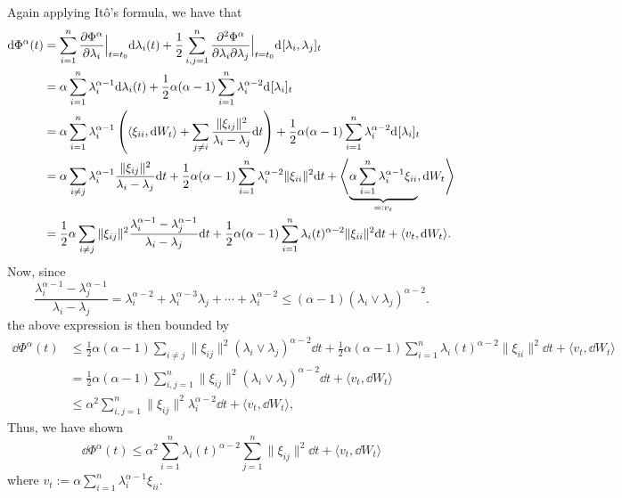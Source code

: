 Again applying Itô's formula, we have that
\begin{align*}
  \dd \Phi^\alpha(t) & = \sum_{i = 1}^n \pdv{\Phi^\alpha}{\lambda_i}\Big\vert_{t = t_0} \dd \lambda_i(t)
    + \frac{1}{2}\sum_{i, j = 1}^n \pdv[2]{\Phi^\alpha}{\lambda_i}{\lambda_j}\Big\vert_{t = t_0} \dd[][\lambda_i, \lambda_j]_{t}\\
  & = \alpha \sum_{i = 1}^n \lambda_i^{\alpha - 1} \dd \lambda_i(t)
    + \frac{1}{2}\alpha(\alpha - 1)\sum_{i = 1}^n \lambda_i^{\alpha - 2} \dd[][\lambda_i]_{t}\\
  & = \alpha \sum_{i = 1}^n \lambda_i^{\alpha - 1} \left(\langle \xi_{ii}, \dd W_t\rangle 
    + \sum_{j \neq i} \frac{\|\xi_{ij}\|^2}{\lambda_i - \lambda_j} \dd t\right) 
    + \frac{1}{2}\alpha(\alpha - 1)\sum_{i = 1}^n \lambda_i^{\alpha - 2} \dd[][\lambda_i]_{t}\\
  & = \alpha \sum_{i \neq j}\lambda_i^{\alpha - 1} \frac{\|\xi_{ij}\|^2}{\lambda_i - \lambda_j} \dd t 
    + \frac{1}{2}\alpha(\alpha - 1)\sum_{i = 1}^n \lambda_i^{\alpha - 2} \|\xi_{ii}\|^2 \dd t
    + \left\langle\underbrace{\alpha \sum_{i = 1}^n \lambda_i^{\alpha - 1} \xi_{ii}}_{=: v_t}, \dd W_t\right\rangle\\
  & = \frac{1}{2}\alpha \sum_{i \neq j}\|\xi_{ij}\|^2\frac{\lambda_i^{\alpha - 1} - \lambda_j^{\alpha -1}}{\lambda_i - \lambda_j}\dd t
    + \frac{1}{2}\alpha(\alpha - 1)\sum_{i = 1}^n \lambda_i(t)^{\alpha - 2} \|\xi_{ii}\|^2 \dd t + \langle v_t, \dd W_t\rangle.
\end{align*}
Now, since 
\[\frac{\lambda_i^{\alpha - 1} - \lambda_j^{\alpha -1}}{\lambda_i - \lambda_j}
  = \lambda_i^{\alpha - 2} + \lambda_i^{\alpha - 3}\lambda_j + \cdots + \lambda_i^{\alpha - 2} 
  \le (\alpha - 1)(\lambda_i \vee \lambda_j)^{\alpha - 2}.\]
the above expression is then bounded by 
\begin{align*}
  \dd \Phi^\alpha(t) & \le \frac{1}{2}\alpha(\alpha - 1) \sum_{i \neq j}\|\xi_{ij}\|^2 (\lambda_i \vee \lambda_j)^{\alpha - 2} \dd t
    + \frac{1}{2}\alpha(\alpha - 1)\sum_{i = 1}^n \lambda_i(t)^{\alpha - 2} \|\xi_{ii}\|^2 \dd t + \langle v_t, \dd W_t\rangle\\
  & = \frac{1}{2}\alpha(\alpha - 1) \sum_{i, j = 1}^n\|\xi_{ij}\|^2 (\lambda_i \vee \lambda_j)^{\alpha - 2} \dd t
    + \langle v_t, \dd W_t\rangle\\
  & \le \alpha^2 \sum_{i, j = 1}^n\|\xi_{ij}\|^2 \lambda_i^{\alpha - 2} \dd t + \langle v_t, \dd W_t\rangle,
\end{align*}
Thus, we have shown 
\begin{equation}\label{eq:potential_bound}
  \dd \Phi^\alpha(t) \le \alpha^2 \sum_{i = 1}^n \lambda_i(t)^{\alpha - 2} \sum_{j = 1}^n \|\xi_{ij}\|^2 \dd t + \langle v_t, \dd W_t\rangle
\end{equation}
where \(v_t := \alpha \sum_{i = 1}^n \lambda_i^{\alpha - 1}\xi_{ii}\).


